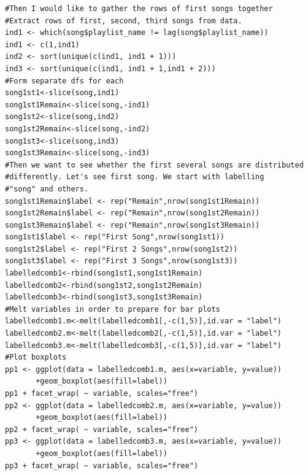 \documentclass[12pt]{article}
\theoremstyle{plain}
\theoremstyle{definition}
\theoremstyle{remark}
\begin{document}
\begin{appendices}
\begin{verbatim}
#Then I would like to gather the rows of first songs together
#Extract rows of first, second, third songs from data.
ind1 <- which(song$playlist_name != lag(song$playlist_name))
ind1 <- c(1,ind1)
ind2 <- sort(unique(c(ind1, ind1 + 1)))
ind3 <- sort(unique(c(ind1, ind1 + 1,ind1 + 2)))
#Form separate dfs for each
song1st1<-slice(song,ind1)
song1st1Remain<-slice(song,-ind1)
song1st2<-slice(song,ind2)
song1st2Remain<-slice(song,-ind2)
song1st3<-slice(song,ind3)
song1st3Remain<-slice(song,-ind3)
#Then we want to see whether the first several songs are distributed
#differently. Let's see first song. We start with labelling 
#"song" and others.
song1st1Remain$label <- rep("Remain",nrow(song1st1Remain))
song1st2Remain$label <- rep("Remain",nrow(song1st2Remain))
song1st3Remain$label <- rep("Remain",nrow(song1st3Remain))
song1st1$label <- rep("First Song",nrow(song1st1))
song1st2$label <- rep("First 2 Songs",nrow(song1st2))
song1st3$label <- rep("First 3 Songs",nrow(song1st3))
labelledcomb1<-rbind(song1st1,song1st1Remain)
labelledcomb2<-rbind(song1st2,song1st2Remain)
labelledcomb3<-rbind(song1st3,song1st3Remain)
#Melt variables in order to prepare for bar plots
labelledcomb1.m<-melt(labelledcomb1[,-c(1,5)],id.var = "label")
labelledcomb2.m<-melt(labelledcomb2[,-c(1,5)],id.var = "label")
labelledcomb3.m<-melt(labelledcomb3[,-c(1,5)],id.var = "label")
#Plot boxplots
pp1 <- ggplot(data = labelledcomb1.m, aes(x=variable, y=value))
       +geom_boxplot(aes(fill=label))
pp1 + facet_wrap( ~ variable, scales="free")
pp2 <- ggplot(data = labelledcomb2.m, aes(x=variable, y=value))
       +geom_boxplot(aes(fill=label))
pp2 + facet_wrap( ~ variable, scales="free")
pp3 <- ggplot(data = labelledcomb3.m, aes(x=variable, y=value))
       +geom_boxplot(aes(fill=label))
pp3 + facet_wrap( ~ variable, scales="free")


\end{verbatim}
\end{appendices}
\end{document}
